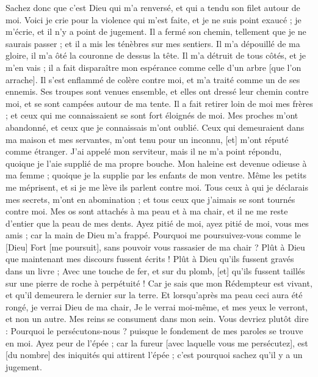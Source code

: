 \begin{multicols}{2}
Sachez donc que c'est Dieu qui m'a renversé, et qui a tendu son filet autour de moi.
Voici je crie pour la violence qui m'est faite, et je ne suis point exaucé ; je m'écrie, et il n'y a point de jugement.
Il a fermé son chemin, tellement que je ne saurais passer ; et il a mis les ténèbres sur mes sentiers.
Il m'a dépouillé de ma gloire, il m'a ôté la couronne de dessus la tête.
Il m'a détruit de tous côtés, et je m'en vais ; il a fait disparaître mon espérance comme celle d'un arbre [que l'on arrache].
Il s'est enflammé de colère contre moi, et m'a traité comme un de ses ennemis.
Ses troupes sont venues ensemble, et elles ont dressé leur chemin contre moi, et se sont campées autour de ma tente.
Il a fait retirer loin de moi mes frères ; et ceux qui me connaissaient se sont fort éloignés de moi.
Mes proches m'ont abandonné, et ceux que je connaissais m'ont oublié.
Ceux qui demeuraient dans ma maison et mes servantes, m'ont tenu pour un inconnu, [et] m'ont réputé comme étranger.
J'ai appelé mon serviteur, mais il ne m'a point répondu, quoique je l'aie supplié de ma propre bouche.
Mon haleine est devenue odieuse à ma femme ; quoique je la supplie par les enfants de mon ventre.
Même les petits me méprisent, et si je me lève ils parlent contre moi.
Tous ceux à qui je déclarais mes secrets, m'ont en abomination ; et tous ceux que j'aimais se sont tournés contre moi.
Mes os sont attachés à ma peau et à ma chair, et il ne me reste d'entier que la peau de mes dents.
Ayez pitié de moi, ayez pitié de moi, vous mes amis ; car la main de Dieu m'a frappé.
Pourquoi me poursuivez-vous comme le [Dieu] Fort [me poursuit], sans pouvoir vous rassasier de ma chair ?
Plût à Dieu que maintenant mes discours fussent écrits ! Plût à Dieu qu'ils fussent gravés dans un livre ;
Avec une touche de fer, et sur du plomb, [et] qu'ils fussent taillés sur une pierre de roche à perpétuité !
Car je sais que mon Rédempteur est vivant, et qu'il demeurera le dernier sur la terre.
Et lorsqu'après ma peau ceci aura été rongé, je verrai Dieu de ma chair,
Je le verrai moi-même, et mes yeux le verront, et non un autre. Mes reins se consument dans mon sein.
Vous devriez plutôt dire : Pourquoi le persécutons-nous ? puisque le fondement de mes paroles se trouve en moi.
Ayez peur de l'épée ; car la fureur [avec laquelle vous me persécutez], est [du nombre] des iniquités qui attirent l'épée ; c'est pourquoi sachez qu'il y a un jugement.

\end{multicols}

